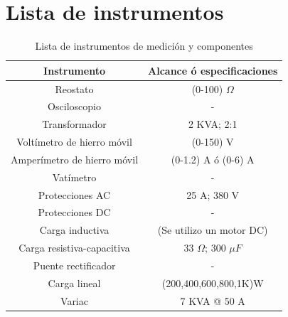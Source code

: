 \documentclass[11pt,letterpaper]{article}     %
\begin{document}
\section{Lista de instrumentos}
\begin{table}[H]
	\caption{Lista de instrumentos de medición y componentes}
	\centering
	\begin{tabular}{|c|c|}
		\hline 
		Instrumento & Alcance ó especificaciones \\ \hline 
		Reostato &  (0-100) $\Omega$ \\  
		\hline 
		Osciloscopio &  - \\ 
		\hline 
		Transformador &  2 KVA; 2:1 \\  
		\hline 
		Voltímetro de hierro móvil &  (0-150) V\\  
		\hline 
		Amperímetro de hierro móvil &(0-1.2) A ó (0-6) A \\ 
		\hline
		Vatímetro & -	\\
		\hline
		Protecciones AC & 25 A; 380 V\\ 
		\hline
		Protecciones DC & -\\ 
		\hline
		Carga inductiva& (Se utilizo un motor DC) \\ 
		\hline
		Carga resistiva-capacitiva& 33 $\Omega$; 300 $\mu F$ \\ 
		\hline
		Puente rectificador & -  \\
		\hline
		Carga lineal & (200,400,600,800,1K)W  \\
		\hline
		Variac & 7 KVA @ 50 A 
		\\
		\hline 
	\end{tabular} 
\end{table}
\end{document}
